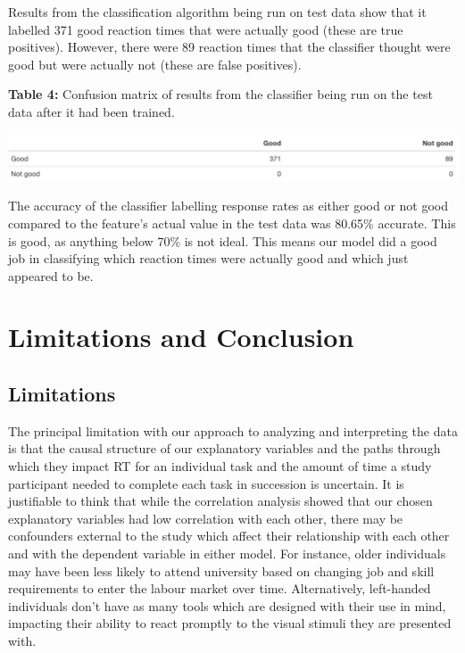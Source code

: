 \documentclass[
]{article}
\begin{document}
Results from the classification algorithm being run on test data show
that it labelled 371 good reaction times that were actually good (these
are true positives). However, there were 89 reaction times that the
classifier thought were good but were actually not (these are false
positives).

\textbf{Table 4:} Confusion matrix of results from the classifier being
run on the test data after it had been trained.

\begin{center}\includegraphics[width=6.11in]{Results_NB_test} \end{center}

The accuracy of the classifier labelling response rates as either good
or not good compared to the feature's actual value in the test data was
80.65\% accurate. This is good, as anything below 70\% is not ideal.
This means our model did a good job in classifying which reaction times
were actually good and which just appeared to be.

\hypertarget{limitations-and-conclusion}{%
\section{Limitations and Conclusion}\label{limitations-and-conclusion}}

\hypertarget{limitations}{%
\subsection{Limitations}\label{limitations}}

The principal limitation with our approach to analyzing and interpreting
the data is that the causal structure of our explanatory variables and
the paths through which they impact RT for an individual task and the
amount of time a study participant needed to complete each task in
succession is uncertain. It is justifiable to think that while the
correlation analysis showed that our chosen explanatory variables had
low correlation with each other, there may be confounders external to
the study which affect their relationship with each other and with the
dependent variable in either model. For instance, older individuals may
have been less likely to attend university based on changing job and
skill requirements to enter the labour market over time. Alternatively,
left-handed individuals don't have as many tools which are designed with
their use in mind, impacting their ability to react promptly to the
visual stimuli they are presented with.
\end{document}

